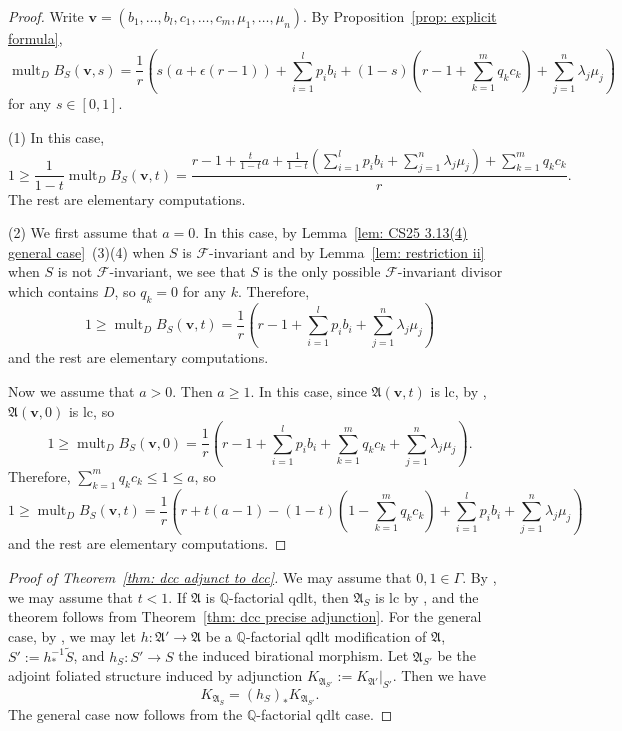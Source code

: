 \documentclass[11pt,reqno]{amsart}
\numberwithin{equation}{section}
\newcommand{\mult}{\operatorname{mult}}
\newcommand{\Aa}{{\mathfrak{A}}}
\newcommand{\Ff}{\mathcal{F}}
\newcommand{\Ii}{\Gamma}
\theoremstyle{definition}
\begin{document}
\begin{proof}
Write $\bm{v}=(b_1,\dots,b_l,c_1,\dots,c_m,\mu_1,\dots,\mu_n)$. By Proposition~\ref{prop: explicit formula},
$$\mult_DB_S(\bm{v},s)=\frac{1}{r}\left(s(a+\epsilon(r-1))+\sum_{i=1}^lp_ib_i+(1-s)\left(r-1+\sum_{k=1}^mq_kc_k\right)+\sum_{j=1}^n\lambda_j\mu_j\right)$$
for any $s\in [0,1]$.

(1) In this case,
$$1\geq \frac{1}{1-t}\mult_DB_S(\bm{v},t)=\frac{r-1+\frac{t}{1-t}a+\frac{1}{1-t}\left(\sum_{i=1}^lp_ib_i+\sum_{j=1}^n\lambda_j\mu_j\right)+\sum_{k=1}^mq_kc_k}{r}.$$
The rest are elementary computations.

(2) We first assume that $a=0$. In this case, by Lemma~\ref{lem: CS25 3.13(4) general case}~(3)(4) when $S$ is $\Ff$-invariant and by Lemma~\ref{lem: restriction ii} when $S$ is not $\Ff$-invariant, we see that $S$ is the only possible $\Ff$-invariant divisor which contains $D$, so $q_k=0$ for any $k$. Therefore,
$$1\geq\mult_DB_S(\bm{v},t)=\frac{1}{r}\left(r-1+\sum_{i=1}^lp_ib_i+\sum_{j=1}^n\lambda_j\mu_j\right)$$
and the rest are elementary computations. 

Now we assume that $a>0$. Then $a\geq 1$. In this case, since $\Aa(\bm{v},t)$ is lc, by \cite[Proposition~3.3]{Cas+24}, $\Aa(\bm{v},0)$ is lc, so
$$1\geq\mult_DB_S(\bm{v},0)=\frac{1}{r}\left(r-1+\sum_{i=1}^lp_ib_i+\sum_{k=1}^mq_kc_k+\sum_{j=1}^n\lambda_j\mu_j\right).$$
Therefore, $\sum_{k=1}^mq_kc_k\leq 1\leq a$, so
$$1\geq\mult_DB_S(\bm{v},t)=\frac{1}{r}\left(r+t(a-1)-(1-t)\left(1-\sum_{k=1}^mq_kc_k\right)+\sum_{i=1}^lp_ib_i+\sum_{j=1}^n\lambda_j\mu_j\right)$$
and the rest are elementary computations. 
\end{proof}


\begin{proof}[Proof of Theorem~\ref{thm: dcc adjunct to dcc}]
We may assume that $0,1\in\Ii$. By \cite[Theorem~6.0.1]{CHLX23}, we may assume that $t<1$. If $\Aa$ is $\mathbb Q$-factorial qdlt, then $\Aa_S$ is lc by \cite[Theorem~1.8]{Cas+24}, and the theorem follows from Theorem~\ref{thm: dcc precise adjunction}. For the general case, by \cite[Theorem~1.9]{Cas+24}, we may let $h\colon \Aa'\rightarrow\Aa$ be a $\mathbb Q$-factorial qdlt modification of $\Aa$, $S':=h^{-1}_*\widetilde{S}$, and $h_S: S'\rightarrow S$ the induced birational morphism. Let $\Aa_{S'}$ be the adjoint foliated structure induced by adjunction $K_{\Aa_{S'}}:=K_{\Aa'}|_{S'}$. Then we have
$$K_{\Aa_S}=(h_S)_*K_{\Aa_{S'}}.$$
The general case now follows from the $\mathbb Q$-factorial qdlt case.
\end{proof}
\end{document}
